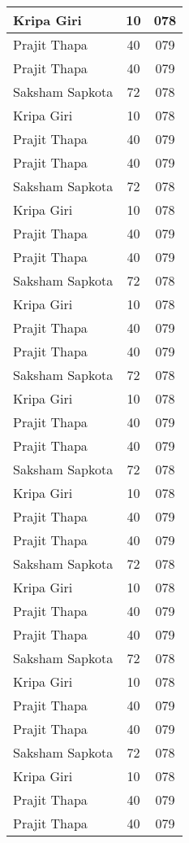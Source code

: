 \documentclass{article}
\begin{document}
\begin{longtable}{|l|c|c|}
		Kripa Giri & 10 & 078 \\\hline
		Prajit Thapa & 40 & 079 \\\hline
		Prajit Thapa & 40 & 079 \\\hline
		Saksham Sapkota & 72 & 078 \\\hline
		Kripa Giri & 10 & 078 \\\hline
		Prajit Thapa & 40 & 079 \\\hline
		Prajit Thapa & 40 & 079 \\\hline
		Saksham Sapkota & 72 & 078 \\\hline
		Kripa Giri & 10 & 078 \\\hline
		Prajit Thapa & 40 & 079 \\\hline
		Prajit Thapa & 40 & 079 \\\hline
		Saksham Sapkota & 72 & 078 \\\hline
		Kripa Giri & 10 & 078 \\\hline
		Prajit Thapa & 40 & 079 \\\hline
		Prajit Thapa & 40 & 079 \\\hline
		Saksham Sapkota & 72 & 078 \\\hline
		Kripa Giri & 10 & 078 \\\hline
		Prajit Thapa & 40 & 079 \\\hline
		Prajit Thapa & 40 & 079 \\\hline
		Saksham Sapkota & 72 & 078 \\\hline
		Kripa Giri & 10 & 078 \\\hline
		Prajit Thapa & 40 & 079 \\\hline
		Prajit Thapa & 40 & 079 \\\hline
		Saksham Sapkota & 72 & 078 \\\hline
		Kripa Giri & 10 & 078 \\\hline
		Prajit Thapa & 40 & 079 \\\hline
		Prajit Thapa & 40 & 079 \\\hline
		Saksham Sapkota & 72 & 078 \\\hline
		Kripa Giri & 10 & 078 \\\hline
		Prajit Thapa & 40 & 079 \\\hline
		Prajit Thapa & 40 & 079 \\\hline
		Saksham Sapkota & 72 & 078 \\\hline
		Kripa Giri & 10 & 078 \\\hline
		Prajit Thapa & 40 & 079 \\\hline
		Prajit Thapa & 40 & 079 \\\hline
	\end{longtable}
\end{document}
